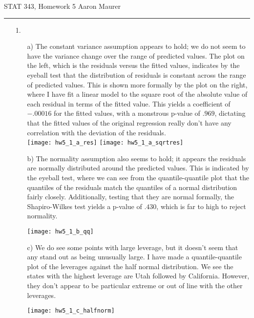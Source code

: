 \documentclass[11pt]{article}
\theoremstyle{definition}
\begin{document}
STAT 343, Homework 5 \hfill Aaron Maurer
\vspace{2mm}
\hrule
\vspace{2mm}
\begin{itemize}
    \item[1.]
        \begin{itemize}
            \item[a)] 
                The constant variance assumption appears to hold; we do not seem to have the variance change over the range of predicted values. The plot on the left, which is the residuals versus the fitted values, indicates by the eyeball test that the distribution of residuals is constant across the range of predicted values. This is shown more formally by the plot on the right, where I have fit a linear model to the square root of the absolute value of each residual in terms of the fitted value. This yields a coefficient of $-.00016$ for the fitted values, with a monstrous p-value of $.969$, dictating that the fitted values of the original regression really don't have any correlation with the deviation of the residuals. \\
                \texttt{[image: hw5\_1\_a\_res]} 
                \texttt{[image: hw5\_1\_a\_sqrtres]} 
            \item[b)]
                The normality assumption also seems to hold; it appears the residuals are normally distributed around the predicted values. This is indicated by the eyeball test, where we can see from the quantile-quantile plot that the quantiles of the residuals match the quantiles of a normal distribution fairly closely. Additionally, testing that they are normal formally, the Shapiro-Wilkes test yields a p-value of $.430$, which is far to high to reject normality.
                \begin{center}
                    \texttt{[image: hw5\_1\_b\_qq]} 
                \end{center}
            \item[c)]
                We do see some points with large leverage, but it doesn't seem that any stand out as being unusually large. I have made a quantile-quantile plot of the leverages against the half normal distribution. We see the states with the highest leverage are Utah followed by California. However, they don't appear to be particular extreme or out of line with the other leverages.
                \begin{center}
                    \texttt{[image: hw5\_1\_c\_halfnorm]} 
                \end{center} 


\end{itemize}
\end{itemize}
\end{document}
